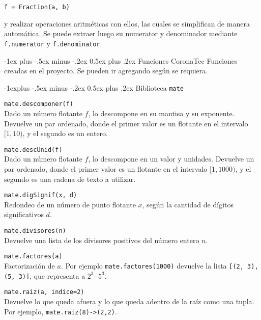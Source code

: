 \documentclass[10pt,landscape]{article}
\makeatletter
\renewcommand{\section}{\@startsection{section}{1}{0mm}%
                                {-1ex plus -.5ex minus -.2ex}%
                                {0.5ex plus .2ex}%
                                {\normalfont\large\bfseries}}
\renewcommand{\subsection}{\@startsection{subsection}{2}{0mm}%
                                {-1explus -.5ex minus -.2ex}%
                                {0.5ex plus .2ex}%
                                {\normalfont\normalsize\bfseries}}
\makeatother
\begin{document}
\begin{multicols}{3}
\verb|f = Fraction(a, b)|

y realizar operaciones aritm\'eticas con ellos, las cuales se simplifican de manera autom\'atica. Se puede extraer luego su numerator y denominador mediante \verb|f.numerator| y \verb|f.denominator|.

\section{Funciones CoronaTec}
Funciones creadas en el proyecto. Se pueden ir agregando seg\'un se requiera.

\subsection{Biblioteca \texttt{mate}}
\begin{asparaitem}
\item \verb|mate.descomponer(f)| \\
  \quad Dado un n\'umero flotante $f$, lo descompone en su mantisa y su exponente. Devuelve un par ordenado, donde el primer valor es un flotante en el intervalo $[1, 10)$, y el segundo es un entero.

\item \verb|mate.descUnid(f)| \\
  \quad Dado un n\'umero flotante $f$, lo descompone en un valor y unidades. Devuelve un par ordenado, donde el primer valor es un flotante en el intervalo $[1, 1000)$, y el segundo es una cadena de texto a utilizar.

\item \verb|mate.digSignif(x, d)| \\
  \quad Redondeo de un n\'umero de punto flotante $x$, seg\'un la cantidad de d\'igitos significativos $d$.

\item \verb|mate.divisores(n)| \\
  \quad Devuelve una lista de los divisores positivos del n\'umero entero $n$.

  \item \verb|mate.factores(a)| \\
\quad Factorización de $a$. Por ejemplo \verb|mate.factores(1000)| devuelve la lista \verb|[(2, 3), (5, 3)]|, que representa a $2^3\cdot 5^3$.

  \item \verb|mate.raiz(a, indice=2)| \\
    \quad Devuelve lo que queda afuera y lo que queda adentro de la ra\'iz como una tupla. Por ejemplo, \verb|mate.raiz(8)->(2,2)|.


\end{asparaitem}
\end{multicols}
\end{document}
